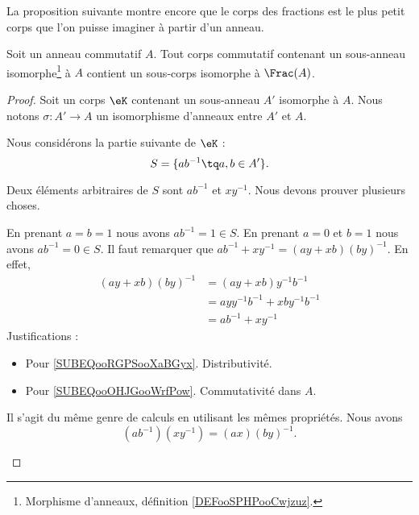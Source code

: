 La proposition suivante montre encore que le corps des fractions est le plus petit corps que l'on puisse imaginer à partir d'un anneau.
\begin{proposition}       \label{PROPooIJBEooDjsoHr}
	Soit un anneau commutatif \( A\). Tout corps commutatif contenant un sous-anneau isomorphe\footnote{Morphisme d'anneaux, définition \ref{DEFooSPHPooCwjzuz}.} à \( A\) contient un sous-corps isomorphe à \( \Frac(A)\).
\end{proposition}

\begin{proof}
	Soit un corps \( \eK\) contenant un sous-anneau \( A'\) isomorphe à \( A\). Nous notons \( \sigma\colon A'\to A\) un isomorphisme d'anneaux entre \( A'\) et \( A\).

	\begin{subproof}

		Nous considérons la partie suivante de \( \eK\) :
		\begin{equation}
			S=\{ ab^{-1}\tq a,b\in A' \}.
		\end{equation}

		Deux éléments arbitraires de \( S\) sont \( ab^{-1}\) et \( xy^{-1}\). Nous devons prouver plusieurs choses.
		\begin{subproof}
			\spitem[Neutres]
			En prenant \( a=b=1\) nous avons \( ab^{-1}=1\in S\). En prenant \( a=0\) et \( b=1\) nous avons \( ab^{-1}=0\in S\).
			\spitem[Somme]
			Il faut remarquer que \( ab^{-1}+xy^{-1}=(ay+xb)(by)^{-1}\). En effet,
			\begin{subequations}
				\begin{align}
					(ay+xb)(by)^{-1} & =(ay+xb)y^{-1}b^{-1}                                           \\
					                 & =ayy^{-1}b^{-1}+xby^{-1}b^{-1}     \label{SUBEQooRGPSooXaBGyx} \\
					                 & =ab^{-1}+xy^{-1}       \label{SUBEQooOHJGooWrfPow}
				\end{align}
			\end{subequations}
			Justifications :
			\begin{itemize}
				\item Pour \eqref{SUBEQooRGPSooXaBGyx}. Distributivité.
				\item Pour \eqref{SUBEQooOHJGooWrfPow}. Commutativité dans \( A\).
			\end{itemize}
			\spitem[Produit]
			Il s'agit du même genre de calculs en utilisant les mêmes propriétés. Nous avons
			\begin{equation}
				(ab^{-1})(xy^{-1})=(ax)(by)^{-1}.
			\end{equation}
		\end{subproof}


\end{subproof}
\end{proof}

